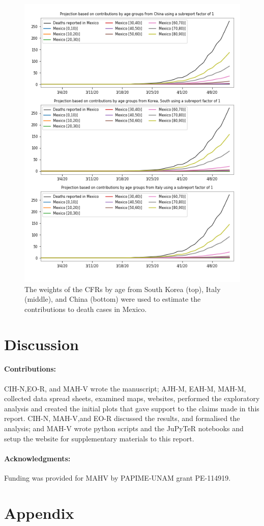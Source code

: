 \documentclass[8pt]{article}
\begin{document}
\begin{figure}[h]
    \centering
    \includegraphics[width=\textwidth]{figures/tsam_COVID19_JHU_cfr+propDeathCasesByAgeTS_EstimatesMexico_subReportFactor1.png}
    \caption{The weights of the CFRs by age from South Korea (top), Italy (middle), and China (bottom) were used to estimate the contributions to death cases in Mexico.}
    \label{fig:cfrsAge}
\end{figure}


\section{Discussion}



\paragraph{Contributions:} CIH-N,EO-R, and MAH-V  wrote the manuscript; AJH-M, EAH-M, MAH-M, collected data spread sheets, examined maps, websites, performed the exploratory analysis and created the initial plots that gave support to the claims made in this report. CIH-N, MAH-V,and EO-R discussed the results, and formalised the analysis; and MAH-V wrote python scripts and the JuPyTeR notebooks and setup the website for supplementary materials to this report. 

\paragraph{Acknowledgments:} Funding was provided for MAHV by PAPIME-UNAM grant PE-114919.

\newpage
\section{Appendix}





\end{document}
